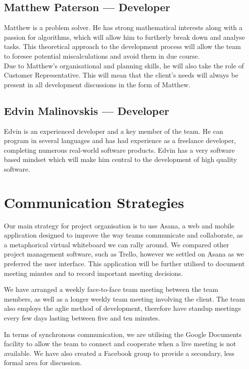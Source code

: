 \documentclass{article}
\begin{document}
\subsection{Matthew Paterson --- Developer}
Matthew is a problem solver. He has strong mathematical interests along with a
passion for algorithms, which will allow him to furtherly break down and
analyse tasks. This theoretical approach to the development process will allow
the team to foresee potential miscalculations and avoid them in due course.\\
Due to Matthew's organisational and planning skills, he will also take the role of Customer Representative. This will mean that the client's needs will always be present in all development discussions in the form of Matthew.

\subsection{Edvin Malinovskis --- Developer}
Edvin is an experienced developer and a key member of the team. He can program
in several languages and has had experience as a freelance developer,
completing numerous real-world software products. Edvin has a very software
based mindset which will make him central to the development of high quality
software. 

\pagebreak
\section{Communication Strategies}



Our main strategy for project organisation is to use Asana, a web and mobile application designed to improve the way teams communicate and collaborate, as a metaphorical virtual whiteboard we can rally around. We compared other project management software, such as Trello, however we settled on Asana as we preferred the user interface. This application will be further utilised to document meeting minutes and to record important meeting decisions.

We have arranged a weekly face-to-face team meeting between the team members, as well as a longer weekly team meeting involving the client. The team also employs the aglie method of development, therefore have standup meetings every few days lasting between five and ten minutes.

In terms of synchronous communication, we are utilising the Google Documents facility to allow the team to connect and cooperate when a live meeting is not available. We have also created a Facebook group to provide a secondary, less formal area for discussion.
\end{document}
